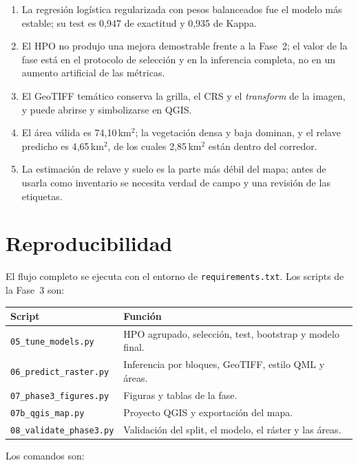 \documentclass{article}
\begin{document}
\begin{enumerate}
 \item La regresión logística regularizada con pesos balanceados fue el modelo más estable; su test es 0{,}947 de exactitud y 0{,}935 de Kappa.
 \item El HPO no produjo una mejora demostrable frente a la Fase~2; el valor de la fase está en el protocolo de selección y en la inferencia completa, no en un aumento artificial de las métricas.
 \item El GeoTIFF temático conserva la grilla, el CRS y el \emph{transform} de la imagen, y puede abrirse y simbolizarse en QGIS.
 \item El área válida es 74{,}10\,km$^2$; la vegetación densa y baja dominan, y el relave predicho es 4{,}65\,km$^2$, de los cuales 2{,}85\,km$^2$ están dentro del corredor.
 \item La estimación de relave y suelo es la parte más débil del mapa; antes de usarla como inventario se necesita verdad de campo y una revisión de las etiquetas.
\end{enumerate}

\section{Reproducibilidad}

El flujo completo se ejecuta con el entorno de \texttt{requirements.txt}. Los scripts de la Fase~3 son:

\begin{table}[htbp]
 \centering
 \small
 \begin{tabularx}{\textwidth}{lX}
  \toprule
  Script & Función \\
  \midrule
  \texttt{05\_tune\_models.py} & HPO agrupado, selección, test, bootstrap y modelo final. \\
  \texttt{06\_predict\_raster.py} & Inferencia por bloques, GeoTIFF, estilo QML y áreas. \\
  \texttt{07\_phase3\_figures.py} & Figuras y tablas de la fase. \\
  \texttt{07b\_qgis\_map.py} & Proyecto QGIS y exportación del mapa. \\
  \texttt{08\_validate\_phase3.py} & Validación del split, el modelo, el ráster y las áreas. \\
  \bottomrule
 \end{tabularx}
\end{table}

Los comandos son:
\end{document}
